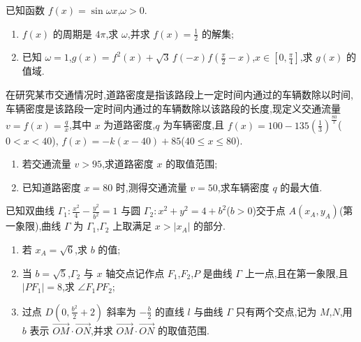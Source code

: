 \begin{problem}
已知函数 \(f(x)=\sin\omega x\),\(\omega>0\).

\begin{enumerate}
\item \(f(x)\) 的周期是 \(4\pi\),求 \(\omega\),并求 \(f(x)=\frac12\) 的解集;
\item 已知 \(\omega=1\),\(g(x)=f^2(x)+\sqrt3\,f(-x)f\!\left(\frac\pi2-x\right)\),\(x\in\left[0,\frac\pi4\right]\),求 \(g(x)\) 的值域.
\end{enumerate}
\end{problem}

\begin{problem}
在研究某市交通情况时,道路密度是指该路段上一定时间内通过的车辆数除以时间,车辆密度是该路段一定时间内通过的车辆数除以该路段的长度,现定义交通流量 \(v=f(x)=\frac{q}{x}\),其中 \(x\) 为道路密度,\(q\) 为车辆密度,且
\(f(x)=100-135\left(\frac13\right)^{\frac{80}{x}}\)(\(0<x<40\)),
\(f(x)=-k(x-40)+85\)(\(40\le x\le80\)).

\begin{enumerate}
\item 若交通流量 \(v>95\),求道路密度 \(x\) 的取值范围;
\item 已知道路密度 \(x=80\) 时,测得交通流量 \(v=50\),求车辆密度 \(q\) 的最大值.
\end{enumerate}
\end{problem}

\begin{problem}
已知双曲线 \(\Gamma_1:\frac{x^2}{4}-\frac{y^2}{b^2}=1\) 与圆 \(\Gamma_2:x^2+y^2=4+b^2\)(\(b>0\))交于点 \(A(x_A,y_A)\)(第一象限),曲线 \(\Gamma\) 为 \(\Gamma_1\),\(\Gamma_2\) 上取满足 \(x>|x_A|\) 的部分.

\begin{enumerate}
\item 若 \(x_A=\sqrt6\),求 \(b\) 的值;
\item 当 \(b=\sqrt5\),\(\Gamma_2\) 与 \(x\) 轴交点记作点 \(F_1\),\(F_2\),\(P\) 是曲线 \(\Gamma\) 上一点,且在第一象限,且 \(|PF_1|=8\),求 \(\angle F_1PF_2\);
\item 过点 \(D\left(0,\frac{b^2}{2}+2\right)\) 斜率为 \(-\frac{b}{2}\) 的直线 \(l\) 与曲线 \(\Gamma\) 只有两个交点,记为 \(M\),\(N\),用 \(b\) 表示 \(\overrightarrow{OM}\cdot\overrightarrow{ON}\),并求 \(\overrightarrow{OM}\cdot\overrightarrow{ON}\) 的取值范围.
\end{enumerate}
\end{problem}

